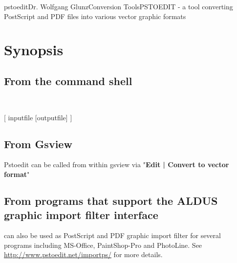 \documentclass[english,a4paper]{article}
\let\URL\url \let\Email\url \let\File\url
\begin{document}
\begin{Name}{1}{pstoedit}{Dr. Wolfgang Glunz}{Conversion Tools}{PSTOEDIT}
   - a tool converting PostScript and PDF files into various
  vector graphic formats
\end{Name}

\section{Synopsis}

\subsection{From the command shell}

  
\\  


[ inputfile [outputfile] ] 

\subsection{From Gsview}

Pstoedit can be called from within gsview via 
"\textbf{Edit | Convert to vector format}"

\subsection{From programs that support the ALDUS graphic import filter interface}
  
 can also be used as PostScript and PDF graphic import filter for several programs including
MS-Office,  PaintShop-Pro and PhotoLine. See 
\URL{http://www.pstoedit.net/importps/} for more 
details.
\end{document}
